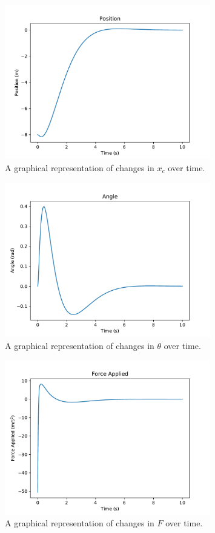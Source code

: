 \documentclass[12pt]{article}
\begin{document}
\begin{figure}[H]
    \centering
    \includegraphics[width=0.8\textwidth]{position}
    \caption{\label{position} A graphical representation of changes in $x _c$ over time.}
\end{figure}

\begin{figure}[H]
    \centering
    \includegraphics[width=0.8\textwidth]{angle}
    \caption{\label{angle} A graphical representation of changes in $\theta$ over time.}
\end{figure}

\begin{figure}[H]
    \centering
    \includegraphics[width=0.8\textwidth]{force}
    \caption{\label{force} A graphical representation of changes in $F$ over time.}
\end{figure}
\end{document}
